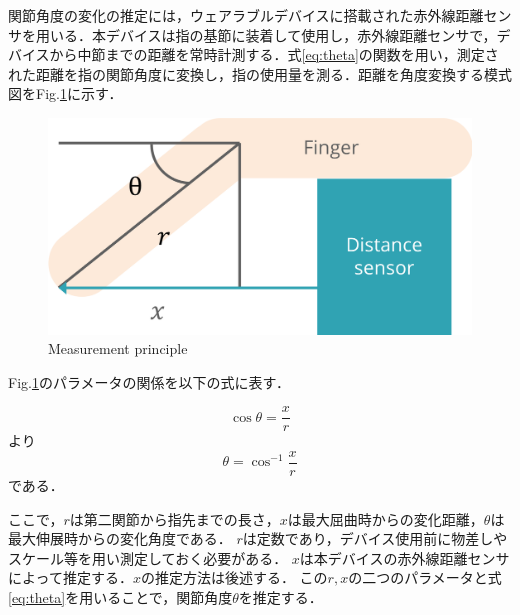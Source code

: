 関節角度の変化の推定には，ウェアラブルデバイスに搭載された赤外線距離センサを用いる．本デバイスは指の基節に装着して使用し，赤外線距離センサで，デバイスから中節までの距離を常時計測する．式\ref{eq:theta}の関数を用い，測定された距離を指の関節角度に変換し，指の使用量を測る．距離を角度変換する模式図をFig.\ref{fig:principle}に示す．

\begin{figure}[H]
  \centering
  \includegraphics[width=0.8\linewidth]{fig/principle}
  \caption{Measurement principle}
  \label{fig:principle}
\end{figure}
Fig.\ref{fig:principle}のパラメータの関係を以下の式に表す．

\begin{equation}
\cos\theta = \frac{x}{r} 
\end{equation}
より
\begin{equation}
\theta = \cos^{-1} \frac{x}{r}
\label{eq:theta}
\end{equation}
である．

ここで，$r$は第二関節から指先までの長さ，$x$は最大屈曲時からの変化距離，$\theta$は最大伸展時からの変化角度である．
$r$は定数であり，デバイス使用前に物差しやスケール等を用い測定しておく必要がある．
$x$は本デバイスの赤外線距離センサによって推定する．$x$の推定方法は後述する．
この$r,x$の二つのパラメータと式\ref{eq:theta}を用いることで，関節角度$\theta$を推定する．



